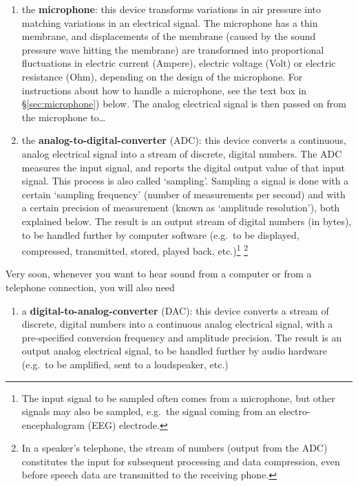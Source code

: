 \documentclass[
]{book}
\providecommand{\tightlist}{%
  \setlength{\itemsep}{0pt}\setlength{\parskip}{0pt}}
\begin{document}
\begin{enumerate}
\def\labelenumi{(\arabic{enumi})}
\item
  the \textbf{microphone}: this device transforms variations in air pressure into matching variations in an electrical signal. The microphone has a thin membrane, and displacements of the membrane (caused by the sound pressure wave hitting the membrane) are transformed into proportional fluctuations in electric current (Ampere), electric voltage (Volt) or electric resistance (Ohm), depending on the design of the microphone. For instructions about how to handle a microphone, see the text box in §\ref{sec:microphone}) below.
  The analog electrical signal is then passed on from the microphone to\ldots{}
\item
  the \textbf{analog-to-digital-converter} (ADC): this device converts a continuous, analog electrical signal into a stream of discrete, digital numbers. The ADC measures the input signal, and reports the digital output value of that input signal. This process is also called `sampling'. Sampling a signal is done with a certain `sampling frequency' (number of measurements per second) and with a certain precision of measurement (known as `amplitude resolution'), both explained below. The result is an output stream of digital numbers (in bytes), to be handled further by computer software (e.g.~to be displayed, compressed, transmitted, stored, played back, etc.)\footnote{The input signal to be sampled often comes from a microphone, but other signals may also be sampled, e.g.~the signal coming from an electro-encephalogram (EEG) electrode.} \footnote{In a speaker's telephone, the stream of numbers (output from the ADC) constitutes the input for subsequent processing and data compression, even before speech data are transmitted to the receiving phone.}
\end{enumerate}

Very soon, whenever you want to hear sound from a computer or from a telephone connection, you will also need

\begin{enumerate}
\def\labelenumi{(\arabic{enumi})}
\setcounter{enumi}{2}
\tightlist
\item
  a \textbf{digital-to-analog-converter} (DAC): this device converts a stream of discrete, digital numbers into a continuous analog electrical signal, with a pre-specified conversion frequency and amplitude precision. The result is an output analog electrical signal, to be handled further by audio hardware (e.g.~to be amplified, sent to a loudspeaker, etc.)
\end{enumerate}
\end{document}
